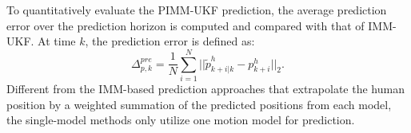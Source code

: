 \documentclass[journal]{IEEEtran}
\begin{document}
	To quantitatively evaluate the PIMM-UKF prediction, the average prediction error over the prediction horizon is computed and compared with that of IMM-UKF. 
	At time $k$, the prediction error is defined as:
	\begin{equation}
		\Delta^{pre}_{p,k}=\frac{1}{N}\sum\limits_{i=1}^{N}||\tilde{p}^h_{k+i|k}-p^h_{k+i}||_2.\label{eqn:pred_err} \nonumber
	\end{equation}
	Different from the IMM-based prediction approaches that extrapolate the human position by a weighted summation of the predicted positions from each model, the single-model methods only utilize one motion model for prediction.

	
\end{document}
